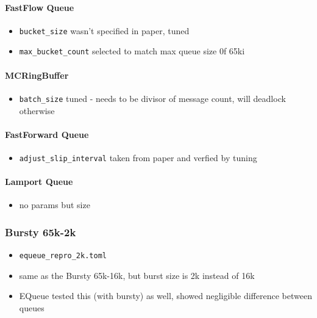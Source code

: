 \paragraph{FastFlow Queue}
\begin{itemize}
    \item \texttt{bucket\_size} wasn't specified in paper, tuned
    \item \texttt{max\_bucket\_count} selected to match max queue size 0f 65ki
\end{itemize}

\paragraph{MCRingBuffer}
\begin{itemize}
    \item \texttt{batch\_size} tuned - needs to be divisor of message count, will deadlock otherwise
\end{itemize}

\paragraph{FastForward Queue}
\begin{itemize}
    \item \texttt{adjust\_slip\_interval} taken from paper and verfied by tuning
\end{itemize}

\paragraph{Lamport Queue}
\begin{itemize}
    \item no params but size
\end{itemize}

\subsubsection{Bursty 65k-2k}
\begin{itemize}
    \item \texttt{equeue\_repro\_2k.toml}
    \item same as the Bursty 65k-16k, but burst size is 2k instead of 16k
    \item EQueue tested this (with bursty) as well, showed negligible difference between queues
\end{itemize}

